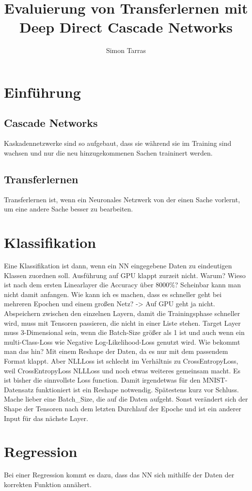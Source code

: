 \documentclass[ngerman]{report}
\title{Evaluierung von Transferlernen mit Deep Direct Cascade Networks}
\author{Simon Tarras}
\begin{document}
    \maketitle
    \chapter{Einführung}
        \section{Cascade Networks}
        Kaskadennetzwerke sind so aufgebaut, dass sie während sie 
        im Training sind wachsen und nur die neu hinzugekommenen 
        Sachen traininert werden.
        \section{Transferlernen}
        Transferlernen ist, wenn ein Neuronales Netzwerk von der 
        einen Sache vorlernt, um eine andere Sache besser zu 
        bearbeiten.
    \chapter{Klassifikation}
    Eine Klassifikation ist dann, wenn ein NN eingegebene Daten zu 
    eindeutigen Klassen zuordnen soll.
    Ausführung auf GPU klappt zurzeit nicht. Warum?
    Wieso ist nach dem ersten Linearlayer die Accuracy über 8000\%?
    Scheinbar kann man nicht damit anfangen.
    Wie kann ich es machen, dass es schneller geht bei mehreren Epochen 
    und einem großen Netz? -> Auf GPU geht ja nicht.
    Abspeichern zwischen den einzelnen Layern, damit die Trainingsphase 
    schneller wird, muss mit Tensoren passieren, die nicht in einer Liste 
    stehen. 
    Target Layer muss 3-Dimensional sein, wenn die Batch-Size größer als 1 
    ist und auch wenn ein multi-Class-Loss wie Negative Log-Likelihood-Loss 
    genutzt wird. Wie bekommt man das hin?
    Mit einem Reshape der Daten, da es nur mit dem passendem Format klappt. 
    Aber NLLLoss ist schlecht im Verhältnis zu CrossEntropyLoss, weil 
    CrossEntropyLoss NLLLoss und noch etwas weiteres gemeinsam macht.
    Es ist bisher die sinnvollste Loss function.
    Damit irgendetwas für den MNIST-Datensatz funktioniert ist ein 
    Reshape notwendig. Spätestens kurz vor Schluss.
    Mache lieber eine Batch_Size, die auf die Daten aufgeht. Sonst verändert 
    sich der Shape der Tensoren nach dem letzten Durchlauf der Epoche und ist 
    ein anderer Input für das nächste Layer.
    \chapter{Regression}
    Bei einer Regression kommt es dazu, dass das NN sich mithilfe 
    der Daten der korrekten Funktion annähert.
\end{document}
